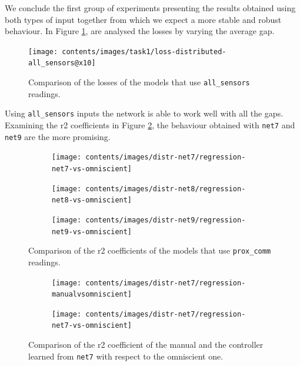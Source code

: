 We conclude the first group of experiments presenting the results obtained using 
both types of input together from which we expect a more stable and robust 
behaviour. 
In Figure \ref{fig:distlossall}, are analysed the losses by varying the average gap. 
\begin{figure}[!htb]
	\centering
	\texttt{[image: contents/images/task1/loss-distributed-all\_sensors@x10]}%
	\caption{Comparison of the losses of the models that use \texttt{all\_sensors} 
		readings.}
	\label{fig:distlossall}
\end{figure}
Using \texttt{all\_sensors} inputs the network is able to work well with all the 
gaps. Examining the \gls{r2} coefficients in Figure \ref{fig:net789r2}, the 
behaviour obtained with \texttt{net7} and \texttt{net9} are the more promising. 
\begin{figure}[H]
	\begin{center}
		\begin{subfigure}[h]{0.47\textwidth}
 			\texttt{[image: contents/images/distr-net7/regression-net7-vs-omniscient]}%
		\end{subfigure}
		\hfill
		\begin{subfigure}[h]{0.47\textwidth}
			\texttt{[image: contents/images/distr-net8/regression-net8-vs-omniscient]}%
		\end{subfigure}
	\end{center}
	\vspace{-1.3\baselineskip}
	\begin{center}
		\begin{subfigure}[h]{0.47\textwidth}
			\texttt{[image: contents/images/distr-net9/regression-net9-vs-omniscient]}
		\end{subfigure}
	\end{center}
	\caption[Comparison of the \gls{r2} coefficient for \texttt{prox\_comm} 
	readings.]{Comparison of the \gls{r2} coefficients of the models that use 
		\texttt{prox\_comm} readings.}
	\label{fig:net789r2}
\end{figure}
\begin{figure}[H]
	\centering
	\begin{subfigure}[h]{0.49\textwidth}
		\centering
		\texttt{[image: contents/images/distr-net7/regression-manualvsomniscient]}%
	\end{subfigure}
	\hfill
	\begin{subfigure}[h]{0.49\textwidth}
		\centering
		\texttt{[image: contents/images/distr-net7/regression-net7-vs-omniscient]}
	\end{subfigure}
	\caption[Evaluation of the \gls{r2} coefficient of \texttt{net7} .]{Comparison of 
		the \gls{r2} coefficient of the manual and the controller 
		learned from \texttt{net7} with respect to the omniscient one.}
	\label{fig:net7r2}
\end{figure}

